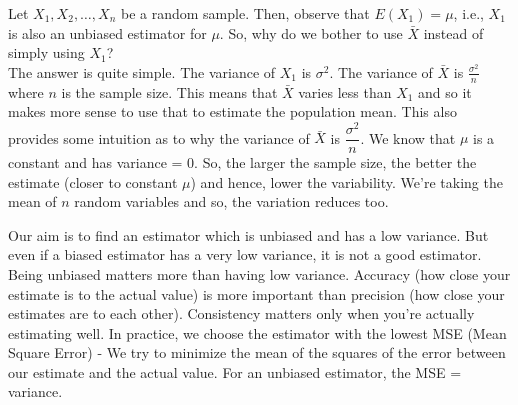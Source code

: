 \begin{note}
\end{note}
Let $X_1, X_2, \dots, X_n$ be a random sample. Then, observe that $E(X_1) = \mu$, i.e., $X_1$ is also an unbiased estimator for $\mu$. So, why do we bother to use $\bar{X}$ instead of simply using $X_1$? \\
The answer is quite simple. The variance of $X_1$ is $\sigma^2$. The variance of $\bar{X}$ is $\frac{\sigma^2}{n}$ where $n$ is the sample size. This means that $\bar{X}$ varies less than $X_1$ and so it makes more sense to use that to estimate the population mean. This also provides some intuition as to why the variance of $\bar{X}$ is $\dfrac{\sigma^2}{n}$. We know that $\mu$ is a constant and has variance = 0. So, the larger the sample size, the better the estimate (closer to constant $\mu$) and hence, lower the variability. We're taking the mean of $n$ random variables and so, the variation reduces too.
\begin{note}
\end{note}
Our aim is to find an estimator which is unbiased and has a low variance. But even if a biased estimator has a very low variance, it is not a good estimator. Being unbiased matters more than having low variance. Accuracy (how close your estimate is to the actual value) is more important than precision (how close your estimates are to each other). Consistency matters only when you're actually estimating well. In practice, we choose the estimator with the lowest MSE (Mean Square Error) - We try to minimize the mean of the squares of the error between our estimate and the actual value. For an unbiased estimator, the MSE = variance.
